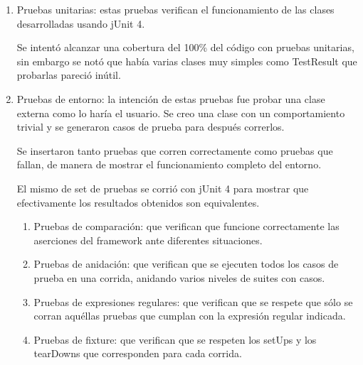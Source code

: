 \documentclass[12pt]{article}
\begin{document}
	\begin{enumerate}
	\item Pruebas unitarias: estas pruebas verifican el funcionamiento de 
	las clases desarrolladas usando jUnit 4. 
	
	Se intentó alcanzar una cobertura del 100\% del código con pruebas 
	unitarias, sin embargo se notó que había varias clases muy simples como 
	TestResult que probarlas pareció inútil.

	\item Pruebas de entorno: la intención de estas pruebas fue probar una 
	clase externa como lo haría el usuario.
	Se creo una clase con un comportamiento trivial y se generaron casos de
	prueba para después correrlos. 
	
	Se insertaron tanto pruebas que corren correctamente como pruebas que
	fallan, de manera de mostrar el funcionamiento completo del entorno.
	
	El mismo de set de pruebas se corrió con jUnit 4 para mostrar que 
	efectivamente los resultados obtenidos son equivalentes.
		\begin{enumerate}
		\item Pruebas de comparación: que verifican que funcione 
		correctamente las aserciones del framework ante diferentes 
		situaciones.
		\item Pruebas de anidación: que verifican que se ejecuten todos
		los casos de prueba en una corrida, anidando varios niveles
		de suites con casos.
		\item Pruebas de expresiones regulares: que verifican que se
		respete que sólo se corran aquéllas pruebas que cumplan con
		la expresión regular indicada.
		\item Pruebas de fixture: que verifican que se respeten los setUps
		y los tearDowns que corresponden para cada corrida.
		\end{enumerate}
	\end{enumerate}
\end{document}
